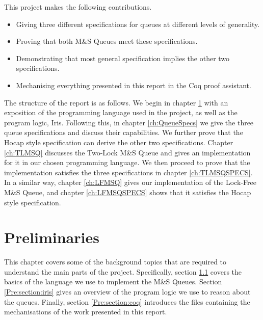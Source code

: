 \documentclass[a4paper, 10pt]{report}
\theoremstyle{definition}
\newcommand{\msq}{M\&S Queue}
\newcommand{\tlmsq}{Two-Lock \msq{}}
\newcommand{\lfmsq}{Lock-Free \msq{}}
\begin{document}
This project makes the following contributions.
\begin{itemize}
  \item Giving three different specifications for queues at different levels of generality.
  \item Proving that both \msq{}s meet these specifications.
  \item Demonstrating that most general specification implies the other two specifications.
  \item Mechanising everything presented in this report in the Coq proof assistant.
\end{itemize}

The structure of the report is as follows. We begin in chapter \ref{ch:pre} with an exposition of the programming language used in the project, as well as the program logic, Iris. Following this, in chapter \ref{ch:QueueSpecs} we give the three queue specifications and discuss their capabilities. We further prove that the Hocap style specification can derive the other two specifications. Chapter \ref{ch:TLMSQ} discusses the \tlmsq{} and gives an implementation for it in our chosen programming language. We then proceed to prove that the implementation satisfies the three specifications in chapter \ref{ch:TLMSQSPECS}. In a similar way, chapter \ref{ch:LFMSQ} gives our implementation of the \lfmsq{}, and chapter \ref{ch:LFMSQSPECS} shows that it satisfies the Hocap style specification.


\chapter{Preliminaries}
\label{ch:pre}

This chapter covers some of the background topics that are required to understand the main parts of the project. Specifically, section \ref{Pre:section:heaplang} covers the basics of the language we use to implement the \msq{}s. Section \ref{Pre:section:iris} gives an overview of the program logic we use to reason about the queues. Finally, section \ref{Pre:section:coq} introduces the files containing the mechanisations of the work presented in this report.

\section{\heaplang}
\label{Pre:section:heaplang}
\end{document}
